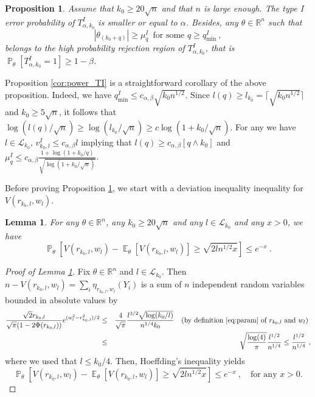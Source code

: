\documentclass[twoside,11pt]{article}
\newtheorem{prp}{Proposition}
\newtheorem{lem}{Lemma}
\def\beq{\begin{equation}}
\def\eeq{\end{equation}}
\def\beqn{\begin{eqnarray*}}
\def\eeqn{\end{eqnarray*}}
\def\cL{\mathcal{L}}
\newcommand{\E}{\operatorname{\mathbb{E}}}
\renewcommand{\P}{\operatorname{\mathbb{P}}}
\newcommand{\<}{\langle}
\renewcommand{\>}{\rangle}
\begin{document}
\begin{prp}\label{prp:test_intermediary}
 Assume that $k_0\geq 20\sqrt{n}$ and that $n$ is large enough. The type I error  probability of  $T^{I}_{\alpha,k_0}$ is smaller or equal to $\alpha$.  Besides, any $\theta\in \mathbb{R}^n$ such that
\beq\label{eq:separation_test_intermediary}
|\theta_{(k_0+q)}|\geq \mu_{q}^{I}\, \text{ for some }q \geq q^I_{\min} \ ,
\eeq 
belongs to the high probability rejection region of $T^{I}_{\alpha,k_0}$, that is $\P_{\theta}[T^{I}_{\alpha,k_0}=1]\geq 1-\beta$.

 
 
\end{prp}


Proposition \ref{cor:power_TI} is a straightforward corollary of the above proposition. Indeed,  we have $q_{\min}^I\leq c_{\alpha,\beta} \sqrt{k_0n^{1/2}}$. Since $l(q)\geq l_{k_0}= \lceil \sqrt{k_0n^{1/2}}\rceil$ and $k_0\geq 5\sqrt{n}$, it follows that $\log(l(q)/\sqrt{n})\geq \log(l_{k_0}/\sqrt{n})\geq c \log(1+k_0/\sqrt{n})$. For any  we have $l\in \cL_{k_0}$, $v_{k_0,l}^I\leq c_{\alpha,\beta} l$ implying that $l(q)\geq c_{\alpha,\beta} [q\wedge k_0]$ and $\mu_q^I\leq c_{\alpha,\beta}\frac{1+ \log(1+k_0/q)}{\sqrt{\log(1+k_0/\sqrt{n})}}$. 
 
\medskip 
 
 Before proving Proposition \ref{prp:test_intermediary}, we start with a deviation inequality inequality for $V(r_{k_0,l},w_l)$. 
\begin{lem}\label{lem:concentration_Vq}
For any $\theta\in \mathbb{R}^n$, any $k_0\geq 20\sqrt{n}$ and any $l\in \cL_{k_0}$ and any $x>0$, we have 
\beq\label{eq:concentration_Ta}
 \P_{\theta}\left[ V(r_{k_0,l},w_l) - \E_{\theta}[V(r_{k_0,l},w_l) ]\geq \sqrt{2ln^{1/2}x} \right]\leq e^{-x} \ .
\eeq
\end{lem}


\begin{proof}[Proof of Lemma \ref{lem:concentration_Vq}]
Fix $\theta\in \mathbb{R}^n$ and $l\in \cL_{k_0}$. Then $n- V(r_{k_0,l},w_l)=\sum_{i}\eta_{r_{k_0,l},w_l}(Y_i)$ is a sum of $n$ independent random variables bounded in absolute values by
\beqn 
\frac{\sqrt{2}r_{k_0,l}}{\sqrt{\pi}(1-2\Phi(r_{k_0,l}))}e^{(w_l^2-r_{k_0,l}^2)/2}&\leq&  \frac{4}{\sqrt{\pi}}\frac{l^{3/2}\sqrt{\log(k_0/l)}}{n^{1/4}k_0} \quad  \text{(by definition \eqref{eq:param} of $r_{k_0,l}$ and $w_l$) }\\
&\leq &  \sqrt{\frac{\log(4)}{\pi}} \frac{l^{1/2}}{n^{1/4}}\leq \frac{l^{1/2}}{n^{1/4}}\ , 
\eeqn 
where we used that $l\leq k_0/4$. Then, Hoeffding's inequality yields 
\[\P_{\theta}\left[ V(r_{k_0,l},w_l) - \E_{\theta}[V(r_{k_0,l},w_l) ]\geq \sqrt{2ln^{1/2}x} \right]\leq e^{-x} \ ,\quad \text{for any $x>0$.}\]


\end{proof} 
 
\end{document}
